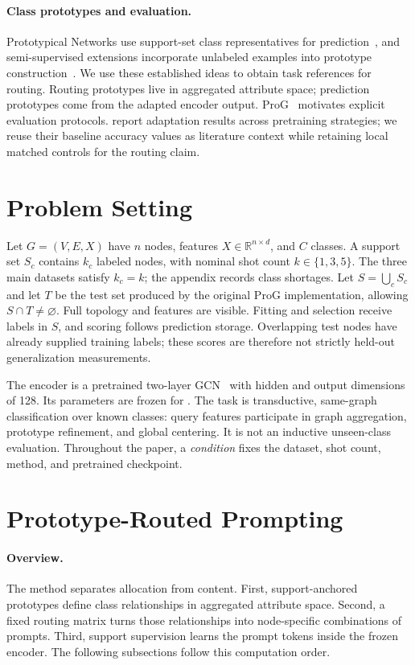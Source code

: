 \paragraph{Class prototypes and evaluation.}
Prototypical Networks use support-set class representatives for prediction~\citep{proto2017}, and semi-supervised extensions incorporate unlabeled examples into prototype construction~\citep{semiproto2018}. We use these established ideas to obtain task references for routing. Routing prototypes live in aggregated attribute space; prediction prototypes come from the adapted encoder output. ProG~\citep{prog2024} motivates explicit evaluation protocols. \citet{mtg2026} report adaptation results across pretraining strategies; we reuse their baseline accuracy values as literature context while retaining local matched controls for the routing claim.

\section{Problem Setting}
Let $G=(V,E,X)$ have $n$ nodes, features $X\in\mathbb R^{n\times d}$, and $C$ classes. A support set $S_c$ contains $k_c$ labeled nodes, with nominal shot count $k\in\{1,3,5\}$. The three main datasets satisfy $k_c=k$; the appendix records class shortages. Let $S=\bigcup_c S_c$ and let $T$ be the test set produced by the original ProG implementation, allowing $S\cap T\ne\varnothing$. Full topology and features are visible. Fitting and selection receive labels in $S$, and scoring follows prediction storage. Overlapping test nodes have already supplied training labels; these scores are therefore not strictly held-out generalization measurements.

The encoder is a pretrained two-layer GCN~\citep{gcn2017} with hidden and output dimensions of 128. Its parameters are frozen for \method. The task is transductive, same-graph classification over known classes: query features participate in graph aggregation, prototype refinement, and global centering. It is not an inductive unseen-class evaluation. Throughout the paper, a \emph{condition} fixes the dataset, shot count, method, and pretrained checkpoint.

\section{Prototype-Routed Prompting}
\label{sec:method}

\paragraph{Overview.}
The method separates allocation from content. First, support-anchored prototypes define class relationships in aggregated attribute space. Second, a fixed routing matrix turns those relationships into node-specific combinations of prompts. Third, support supervision learns the prompt tokens inside the frozen encoder. The following subsections follow this computation order.
